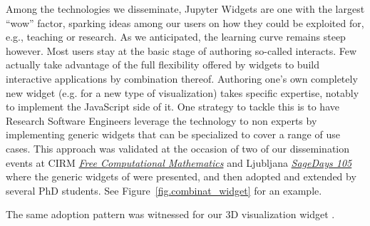 \documentclass{deliverablereport}
\begin{document}
Among the technologies we disseminate, Jupyter Widgets are one with
the largest ``wow'' factor, sparking ideas among our users on how they
could be exploited for, e.g., teaching or research. As we anticipated,
the learning curve remains steep however. Most users stay at the basic
stage of authoring so-called interacts. Few actually take advantage of
the full flexibility offered by widgets to build interactive
applications by combination thereof. Authoring one's own completely
new widget (e.g. for a new type of visualization) takes specific
expertise, notably to implement the JavaScript side of it. One
strategy to tackle this is to have Research Software Engineers leverage
the technology to non experts by implementing generic widgets that can
be specialized to cover a range of use cases. This approach was
validated at the occasion of two of our dissemination events at CIRM
\href{https://conferences.cirm-math.fr/1978.html}{\emph{Free
Computational Mathematics}} and Ljubljana
\href{https://wiki.sagemath.org/fpsac19}{\emph{SageDays 105}} where
the generic widgets of 
were presented, and then adopted and extended by several PhD students.
See Figure~\ref{fig.combinat_widget} for an example.

The same adoption pattern was witnessed for our 3D visualization
widget .
\end{document}
